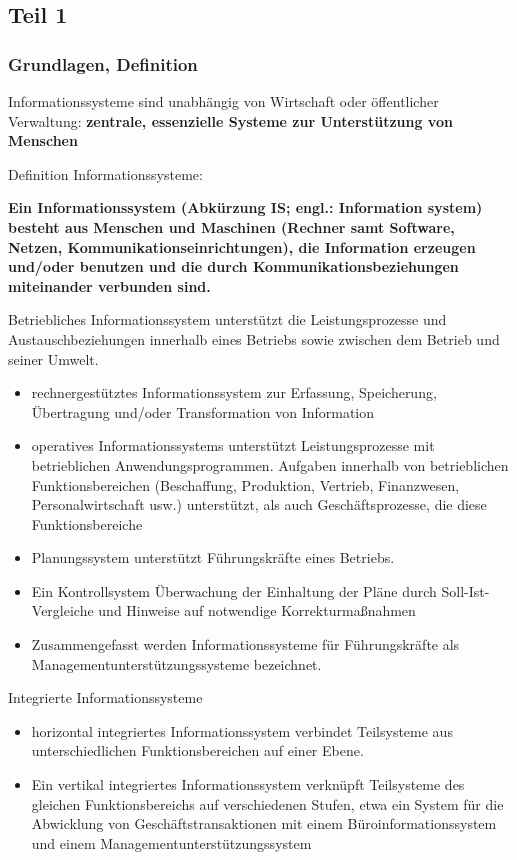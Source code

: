 \subsection{Teil 1}
\subsubsection{Grundlagen, Definition}
Informationssysteme sind unabhängig von Wirtschaft oder öffentlicher Verwaltung:
\textbf{zentrale, essenzielle Systeme zur Unterstützung von Menschen}
\par
Definition Informationssysteme:
\par
\textbf{Ein Informationssystem (Abkürzung IS; engl.: Information system) besteht aus Menschen und Maschinen (Rechner samt Software, Netzen, Kommunikationseinrichtungen), die Information erzeugen und/oder benutzen und die durch Kommunikationsbeziehungen miteinander verbunden sind.}
\par
Betriebliches Informationssystem unterstützt die Leistungsprozesse und Austauschbeziehungen innerhalb eines Betriebs sowie zwischen dem Betrieb und seiner Umwelt.
\par
\begin{itemize}
  \item rechnergestütztes Informationssystem zur Erfassung, Speicherung, Übertragung und/oder Transformation von Information
  \item operatives Informationssystems unterstützt Leistungsprozesse mit betrieblichen Anwendungsprogrammen. Aufgaben innerhalb von betrieblichen Funktionsbereichen (Beschaffung, Produktion, Vertrieb, Finanzwesen, Personalwirtschaft usw.) unterstützt, als auch Geschäftsprozesse, die diese Funktionsbereiche 
  \item Planungssystem unterstützt Führungskräfte eines Betriebs.
  \item Ein Kontrollsystem Überwachung der Einhaltung der Pläne durch Soll-Ist-Vergleiche und Hinweise auf notwendige Korrekturmaßnahmen
  \item Zusammengefasst werden Informationssysteme für Führungskräfte als Managementunterstützungssysteme bezeichnet.
\end{itemize}
\par
Integrierte Informationssysteme
\begin{itemize}
  \item horizontal integriertes Informationssystem verbindet Teilsysteme aus unterschiedlichen Funktionsbereichen auf einer Ebene.
  \item Ein vertikal integriertes Informationssystem verknüpft Teilsysteme des gleichen Funktionsbereichs auf verschiedenen Stufen, etwa ein System für die Abwicklung von Geschäftstransaktionen mit einem Büroinformationssystem und einem Managementunterstützungssystem 
\end{itemize}
